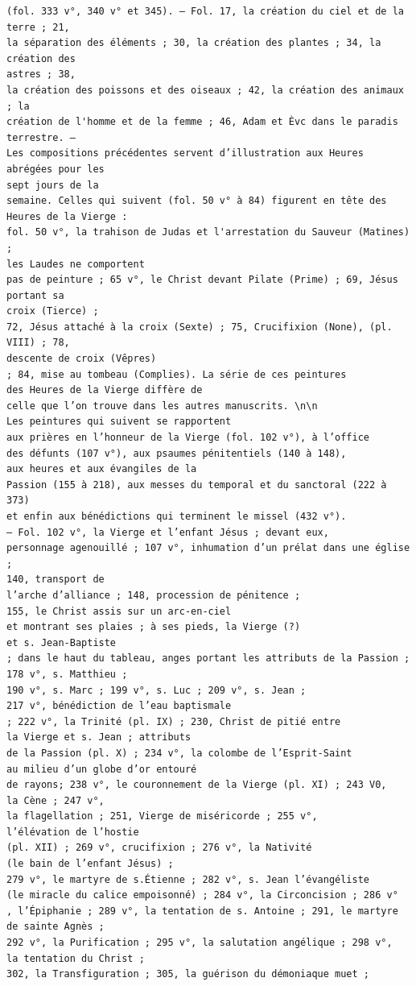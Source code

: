 \documentclass[a4paper,12pt,twoside]{book}
\begin{document}
\begin{verbatim}
(fol. 333 v°, 340 v° et 345). — Fol. 17, la création du ciel et de la terre ; 21,
la séparation des éléments ; 30, la création des plantes ; 34, la création des
astres ; 38, 
la création des poissons et des oiseaux ; 42, la création des animaux ; la
création de l'homme et de la femme ; 46, Adam et Èvc dans le paradis terrestre. — 
Les compositions précédentes servent d’illustration aux Heures abrégées pour les 
sept jours de la 
semaine. Celles qui suivent (fol. 50 v° à 84) figurent en tête des
Heures de la Vierge : 
fol. 50 v°, la trahison de Judas et l'arrestation du Sauveur (Matines) ; 
les Laudes ne comportent
pas de peinture ; 65 v°, le Christ devant Pilate (Prime) ; 69, Jésus portant sa
croix (Tierce) ;
72, Jésus attaché à la croix (Sexte) ; 75, Crucifixion (None), (pl. VIII) ; 78, 
descente de croix (Vêpres) 
; 84, mise au tombeau (Complies). La série de ces peintures 
des Heures de la Vierge diffère de 
celle que l’on trouve dans les autres manuscrits. \n\n
Les peintures qui suivent se rapportent 
aux prières en l’honneur de la Vierge (fol. 102 v°), à l’office 
des défunts (107 v°), aux psaumes pénitentiels (140 à 148),
aux heures et aux évangiles de la 
Passion (155 à 218), aux messes du temporal et du sanctoral (222 à 373) 
et enfin aux bénédictions qui terminent le missel (432 v°).
— Fol. 102 v°, la Vierge et l’enfant Jésus ; devant eux,
personnage agenouillé ; 107 v°, inhumation d’un prélat dans une église ;
140, transport de
l’arche d’alliance ; 148, procession de pénitence ; 
155, le Christ assis sur un arc-en-ciel 
et montrant ses plaies ; à ses pieds, la Vierge (?) 
et s. Jean-Baptiste 
; dans le haut du tableau, anges portant les attributs de la Passion ;
178 v°, s. Matthieu ;
190 v°, s. Marc ; 199 v°, s. Luc ; 209 v°, s. Jean ;
217 v°, bénédiction de l’eau baptismale 
; 222 v°, la Trinité (pl. IX) ; 230, Christ de pitié entre
la Vierge et s. Jean ; attributs
de la Passion (pl. X) ; 234 v°, la colombe de l’Esprit-Saint 
au milieu d’un globe d’or entouré 
de rayons; 238 v°, le couronnement de la Vierge (pl. XI) ; 243 V0,
la Cène ; 247 v°,
la flagellation ; 251, Vierge de miséricorde ; 255 v°,
l’élévation de l’hostie
(pl. XII) ; 269 v°, crucifixion ; 276 v°, la Nativité
(le bain de l’enfant Jésus) ;
279 v°, le martyre de s.Étienne ; 282 v°, s. Jean l’évangéliste
(le miracle du calice empoisonné) ; 284 v°, la Circoncision ; 286 v°
, l’Épiphanie ; 289 v°, la tentation de s. Antoine ; 291, le martyre
de sainte Agnès ;
292 v°, la Purification ; 295 v°, la salutation angélique ; 298 v°,
la tentation du Christ ;
302, la Transfiguration ; 305, la guérison du démoniaque muet ; 

\end{verbatim}
\end{document}
